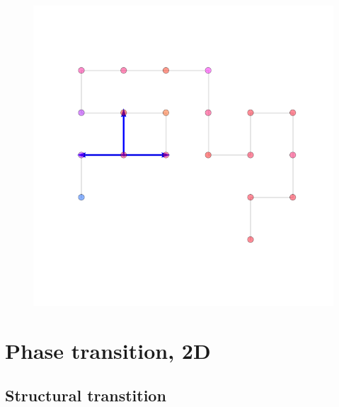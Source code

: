 \documentclass{beamer}
\begin{document}
\begin{frame}
\begin{minipage}{0.56\linewidth}
\begin{figure}[h]
			\includegraphics[scale=0.122]{state_example_cluster.png}
			\label{ph}
		\end{figure}
	\end{minipage}
\end{frame}



\section{Phase transition, 2D }
\subsection{Structural transtition }
\end{document}
